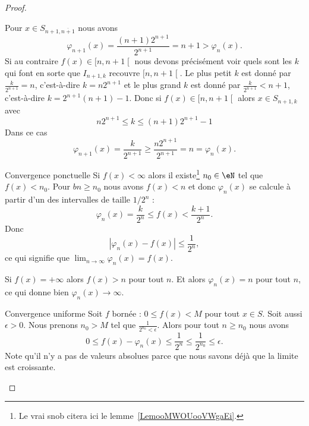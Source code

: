 \begin{proof}
\begin{subproof}
        Pour \( x\in S_{n+1,\overline{ n+1 }}\) nous avons
        \begin{equation}
            \varphi_{n+1}(x)=\frac{ (n+1)2^{n+1} }{ 2^{n+1} }=n+1>\varphi_n(x).
        \end{equation}
        Si au contraire \( f(x)\in\mathopen[ n , n+1 \mathclose[ \) nous devons précisément voir quels sont les \( k\) qui font en sorte que \( I_{n+1,k}\) recouvre \( \mathopen[ n , n+1 \mathclose[\). Le plus petit \( k\) est donné par \( \frac{ k }{ 2^{n+1} }=n\), c'est-à-dire \( k=n2^{n+1}\) et le plus grand \( k\) est donné par \( \frac{ k }{ 2^{n+1} }<n+1\), c'est-à-dire \( k=2^{n+1}(n+1)-1\). Donc si \( f(x)\in\mathopen[ n , n+1 \mathclose[\) alors \( x\in S_{n+1,k}\) avec
            \begin{equation}
                n2^{n+1}\leq k\leq (n+1)2^{n+1}-1
            \end{equation}
            Dans ce cas
            \begin{equation}
                \varphi_{n+1}(x)=\frac{ k }{ 2^{n+1} }\geq \frac{ n2^{n+1} }{ 2^{n+1} }=n=\varphi_n(x).
            \end{equation}
    \item[Convergence ponctuelle]
        Si \( f(x)<\infty\) alors il existe\footnote{Le vrai snob citera ici le lemme~\ref{LemooMWOUooVWgaEi}.} \( n_0\in\eN\) tel que \( f(x)<n_0\). Pour \( bn\geq n_0\) nous avons \( f(x)<n\) et donc \( \varphi_n(x)\) se calcule à partir d'un des intervalles de taille \( 1/2^n\) :
        \begin{equation}
            \varphi_n(x)=\frac{ k }{ 2^n }\leq f(x)<\frac{ k+1 }{ 2^n }.
        \end{equation}
        Donc
        \begin{equation}
            | \varphi_n(x)-f(x) |\leq \frac{1}{ 2^n },
        \end{equation}
        ce qui signifie que \( \lim_{n\to \infty} \varphi_n(x)=f(x)\).

        Si \( f(x)=+\infty\) alors \( f(x)>n\) pour tout \( n\). Et alors \( \varphi_n(x)=n\) pour tout \( n\), ce qui donne bien \( \varphi_n(x)\to \infty\).
    \item[Convergence uniforme]
        Soit \( f\) bornée : \( 0\leq f(x)<M\) pour tout \( x\in S\). Soit aussi \( \epsilon>0\). Nous prenons \( n_0>M\) tel que \( \frac{1}{ 2^{n_0}<\epsilon }\). Alors pour tout \( n\geq n_0\) nous avons
        \begin{equation}
            0\leq f(x)-\varphi_n(x)\leq \frac{1}{ 2^n }\leq \frac{1}{ 2^{n_0} }\leq \epsilon.
        \end{equation}
        Note qu'il n'y a pas de valeurs absolues parce que nous savons déjà que la limite est croissante.
    \end{subproof}
\end{proof}

